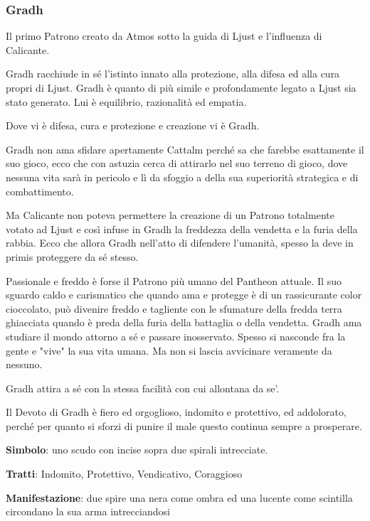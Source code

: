 \documentclass[a4paper,11pt,twoside,openany]{book}
\begin{document}
\subsubsection{Gradh}

\label{gradh}

Il primo Patrono creato da Atmos sotto la guida di Ljust e l'influenza di Calicante.

Gradh racchiude in sé l'istinto innato alla protezione, alla difesa ed alla cura propri di Ljust. Gradh è quanto di più simile e profondamente legato a Ljust sia stato generato. Lui è equilibrio, razionalità ed empatia.

Dove vi è difesa, cura e protezione e creazione vi è Gradh.

Gradh non ama sfidare apertamente Cattalm perché sa che farebbe esattamente il suo gioco, ecco che con astuzia cerca di attirarlo nel suo terreno di gioco, dove nessuna vita sarà in pericolo e lì da sfoggio a della sua superiorità strategica e di combattimento.

Ma Calicante non poteva permettere la creazione di un Patrono totalmente votato ad Ljust e così infuse in Gradh la freddezza della vendetta e la furia della rabbia. Ecco che allora Gradh nell'atto di difendere l'umanità, spesso la deve in primis proteggere da sé stesso.

Passionale e freddo è forse il Patrono più umano del Pantheon attuale. Il suo sguardo caldo e carismatico che quando ama e protegge è di un rassicurante color cioccolato, può divenire freddo e tagliente con le sfumature della fredda terra ghiacciata quando è preda della furia della battaglia o della vendetta. Gradh ama studiare il mondo attorno a sé e passare inosservato. Spesso si nasconde fra la gente e "vive" la sua vita umana. Ma non si lascia avvicinare veramente da nessuno.

Gradh attira a sé con la stessa facilità con cui allontana da se'.

Il Devoto di Gradh è fiero ed orgoglioso, indomito e protettivo, ed addolorato, perché per quanto si sforzi di punire il male questo continua sempre a prosperare.

\textbf{Simbolo}: uno scudo con incise sopra due spirali intrecciate.

\textbf{Tratti}: Indomito, Protettivo, Vendicativo, Coraggioso

\textbf{Manifestazione}: due spire una nera come ombra ed una lucente come scintilla circondano la sua arma intrecciandosi
\end{document}
